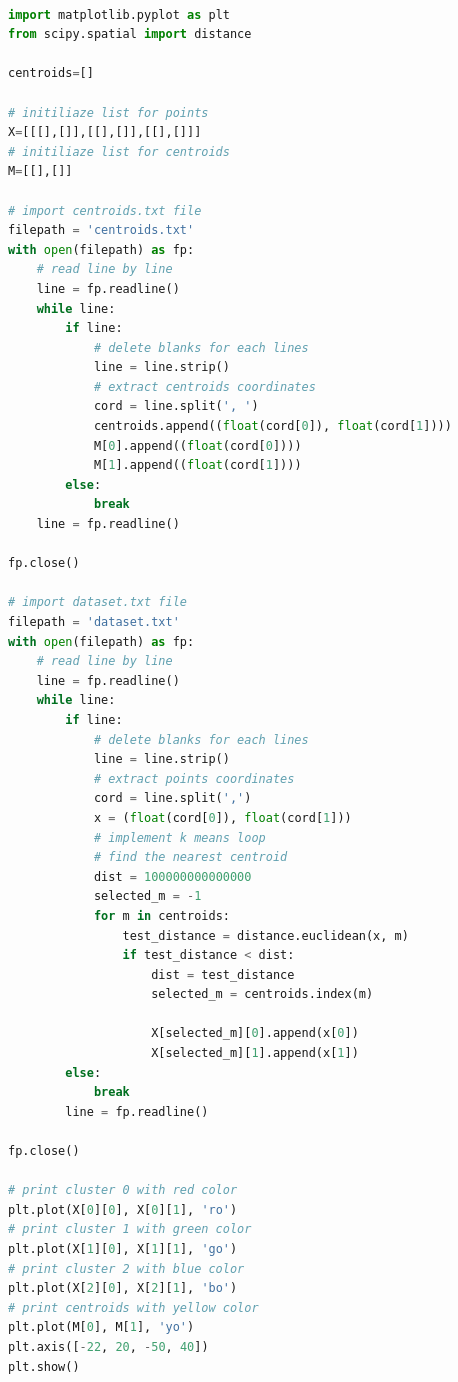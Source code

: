 \HRule \\[0.4cm] %
\begin{lstlisting}[language=Python]
import matplotlib.pyplot as plt
from scipy.spatial import distance

centroids=[]

# initiliaze list for points
X=[[[],[]],[[],[]],[[],[]]]
# initiliaze list for centroids
M=[[],[]]

# import centroids.txt file
filepath = 'centroids.txt'
with open(filepath) as fp:
	# read line by line
	line = fp.readline()
	while line:
		if line:
			# delete blanks for each lines
			line = line.strip()
			# extract centroids coordinates
			cord = line.split(', ')
			centroids.append((float(cord[0]), float(cord[1])))
			M[0].append((float(cord[0])))
			M[1].append((float(cord[1])))
		else:
			break
	line = fp.readline()

fp.close()

# import dataset.txt file
filepath = 'dataset.txt'
with open(filepath) as fp:
	# read line by line
	line = fp.readline()
	while line:
		if line:
			# delete blanks for each lines
			line = line.strip()
			# extract points coordinates
			cord = line.split(',')
			x = (float(cord[0]), float(cord[1]))
			# implement k means loop
			# find the nearest centroid
			dist = 100000000000000
			selected_m = -1
			for m in centroids:
				test_distance = distance.euclidean(x, m)
				if test_distance < dist:
					dist = test_distance
					selected_m = centroids.index(m)
					
					X[selected_m][0].append(x[0])
					X[selected_m][1].append(x[1])
		else:
			break
		line = fp.readline()

fp.close()

# print cluster 0 with red color
plt.plot(X[0][0], X[0][1], 'ro')
# print cluster 1 with green color
plt.plot(X[1][0], X[1][1], 'go')
# print cluster 2 with blue color
plt.plot(X[2][0], X[2][1], 'bo')
# print centroids with yellow color
plt.plot(M[0], M[1], 'yo')
plt.axis([-22, 20, -50, 40])
plt.show()
\end{lstlisting}
\HRule \\[0.2cm] %

